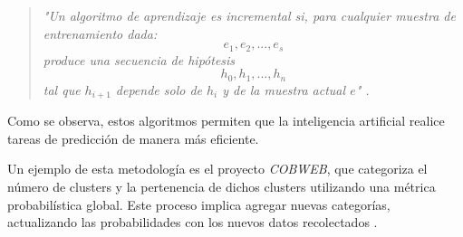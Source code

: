 \begin{quote}
\textit{"Un algoritmo de aprendizaje es incremental si, para cualquier muestra de entrenamiento dada:
\begin{equation*}
    e_1, e_2, ..., e_s
\end{equation*}
produce una secuencia de hipótesis
\begin{equation*}
    h_0, h_1, ..., h_n
\end{equation*}
tal que \(h_{i+1}\) depende solo de \(h_i\) y de la muestra actual \(e\)" \cite{GiraudCarrier2000}.}
\end{quote}

Como se observa, estos algoritmos permiten que la inteligencia artificial realice tareas de predicción de manera más eficiente.

Un ejemplo de esta metodología es el proyecto \textit{COBWEB}, que categoriza el número de clusters y la pertenencia de dichos clusters utilizando una métrica probabilística global. Este proceso implica agregar nuevas categorías, actualizando las probabilidades con los nuevos datos recolectados \cite{fisher1987}.